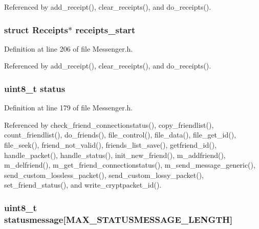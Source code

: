 Referenced by add\+\_\+receipt(), clear\+\_\+receipts(), and do\+\_\+receipts().

\hypertarget{struct_friend_a49fea7d214384bfdb887ce868fef0e93}{
\subsubsection[{receipts\+\_\+start}]{\setlength{\rightskip}{0pt plus 5cm}struct {\bf Receipts}$\ast$ receipts\+\_\+start}}\label{struct_friend_a49fea7d214384bfdb887ce868fef0e93}


Definition at line 206 of file Messenger.\+h.



Referenced by add\+\_\+receipt(), clear\+\_\+receipts(), and do\+\_\+receipts().

\hypertarget{struct_friend_ade818037fd6c985038ff29656089758d}{
\subsubsection[{status}]{\setlength{\rightskip}{0pt plus 5cm}uint8\+\_\+t status}}\label{struct_friend_ade818037fd6c985038ff29656089758d}


Definition at line 179 of file Messenger.\+h.



Referenced by check\+\_\+friend\+\_\+connectionstatus(), copy\+\_\+friendlist(), count\+\_\+friendlist(), do\+\_\+friends(), file\+\_\+control(), file\+\_\+data(), file\+\_\+get\+\_\+id(), file\+\_\+seek(), friend\+\_\+not\+\_\+valid(), friends\+\_\+list\+\_\+save(), getfriend\+\_\+id(), handle\+\_\+packet(), handle\+\_\+status(), init\+\_\+new\+\_\+friend(), m\+\_\+addfriend(), m\+\_\+delfriend(), m\+\_\+get\+\_\+friend\+\_\+connectionstatus(), m\+\_\+send\+\_\+message\+\_\+generic(), send\+\_\+custom\+\_\+lossless\+\_\+packet(), send\+\_\+custom\+\_\+lossy\+\_\+packet(), set\+\_\+friend\+\_\+status(), and write\+\_\+cryptpacket\+\_\+id().

\hypertarget{struct_friend_a8f12612ac1191135a1a5b1cbcbc82852}{
\subsubsection[{statusmessage}]{\setlength{\rightskip}{0pt plus 5cm}uint8\+\_\+t statusmessage\mbox{[}{\bf M\+A\+X\+\_\+\+S\+T\+A\+T\+U\+S\+M\+E\+S\+S\+A\+G\+E\+\_\+\+L\+E\+N\+G\+T\+H}\mbox{]}}}\label{struct_friend_a8f12612ac1191135a1a5b1cbcbc82852}


